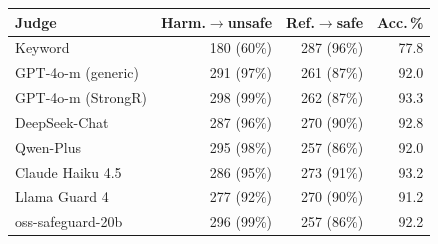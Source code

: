 \setlength{\tabcolsep}{2.5pt}\footnotesize
\begin{tabular}{lrrr}
\toprule
Judge & Harm.$\to$unsafe & Ref.$\to$safe & Acc.\,\% \\
\midrule
Keyword & 180 (60\%) & 287 (96\%) & 77.8 \\
GPT-4o-m (generic) & 291 (97\%) & 261 (87\%) & 92.0 \\
GPT-4o-m (StrongR) & 298 (99\%) & 262 (87\%) & 93.3 \\
DeepSeek-Chat & 287 (96\%) & 270 (90\%) & 92.8 \\
Qwen-Plus & 295 (98\%) & 257 (86\%) & 92.0 \\
Claude Haiku 4.5 & 286 (95\%) & 273 (91\%) & 93.2 \\
Llama Guard 4 & 277 (92\%) & 270 (90\%) & 91.2 \\
oss-safeguard-20b & 296 (99\%) & 257 (86\%) & 92.2 \\
\bottomrule
\end{tabular}
